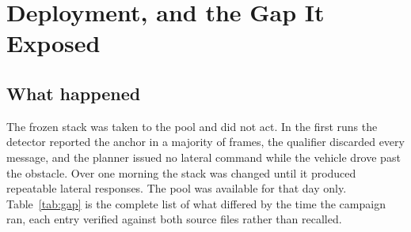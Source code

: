 \section{Deployment, and the Gap It Exposed}
\label{sec:deployment}

\subsection{What happened}

The frozen stack was taken to the pool and did not act. In the first
runs the detector reported the anchor in a majority of frames, the
qualifier discarded every message, and the planner issued no lateral
command while the vehicle drove past the obstacle. Over one morning the
stack was changed until it produced repeatable lateral responses. The
pool was available for that day only. Table~\ref{tab:gap} is the complete list of
what differed by the time the campaign ran, each entry verified against
both source files rather than recalled.

\begin{table}[t]
\centering
\caption{The deployment gap \realmark: every difference between the
stack that produced the frozen predictions and the stack that flew.
\emph{forced} marks a change made deliberately on the day;
\emph{unnoticed} marks a difference nobody acted on, which the
post-deployment ablation (Section~\ref{sec:diagnostic}) finds to matter
more than most of the forced ones.}
\label{tab:gap}
\setlength{\tabcolsep}{4pt}
\end{table}

